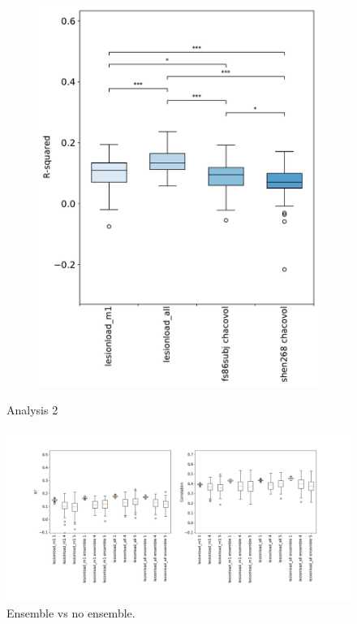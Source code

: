 \documentclass[10pt]{article}
\begin{document}
\begin{figure}
\begin{subfigure}{0.5\textwidth}
  \includegraphics[width=1\linewidth]{figures/analysis_2_boxplots_rsquared.pdf}
  \caption{}
  \label{fig:sfig1}
\end{subfigure}
\caption{Analysis 2}
\label{fig:fig}
\end{figure}

\begin{figure}[htp]
\centering
\includegraphics[width=1.0\linewidth]{figures/boxplots_5.png}
\caption{Ensemble vs no ensemble.}
\label{nemotool}
\end{figure}
\end{document}
